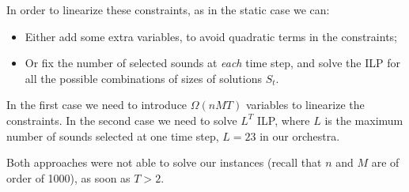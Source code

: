 \documentclass[a4paper]{book}
\begin{document}
In order to linearize these constraints, as in the static case we can:
\begin{itemize}
    \item Either add some extra variables, to avoid quadratic terms in the constraints;
    \item Or fix the number of selected sounds at {\it each} time step, and solve the ILP for all the possible combinations of sizes of solutions $S_t$.
\end{itemize}
In the first case we need to introduce $\Omega(nMT)$ variables to linearize the constraints. In the second case we need to solve $L^T$ ILP, where $L$ is the maximum number of sounds selected at one time step, $L=23$ in our orchestra.

Both approaches were not able to solve our instances (recall that $n$ and $M$ are of order of 1000), as soon as $T>2$. 






\end{document}
